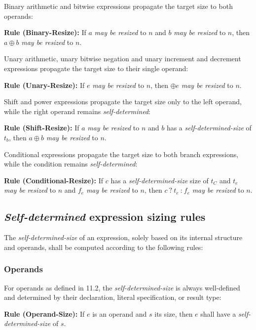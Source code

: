 \documentclass{article}
\newcommand{\sds}{\emph{self-determined-size}}
\newcommand{\mbr}{\emph{may be resized}}
\newenvironment{typingrule}[1]%
{\par\noindent\textbf{Rule (#1):} }%
{\par}
\begin{document}
Binary arithmetic and bitwise expressions propagate the target size to both
operands:

\begin{typingrule}{Binary-Resize}
  If $a$ \mbr{} to $n$ and $b$ \mbr{} to $n$, then $a \oplus b$ \mbr{} to $n$.
\end{typingrule}

Unary arithmetic, unary bitwise negation and unary increment and decrement
expressions propagate the target size to their single operand:

\begin{typingrule}{Unary-Resize}
  If $e$ \mbr{} to $n$, then $\oplus e$ \mbr{} to $n$.
\end{typingrule}

Shift and power expressions propagate the target size only to the left operand,
while the right operand remains \emph{self-determined}:

\begin{typingrule}{Shift-Resize}
  If $a$ \mbr{} to $n$ and $b$ has a \sds{} of $t_{b}$, then
  $a \oplus b$ \mbr{} to $n$.
\end{typingrule}

Conditional expressions propagate the target size to both branch expressions,
while the condition remains \emph{self-determined}:

\begin{typingrule}{Conditional-Resize}
  If $c$ has a \sds{} size of $t_{C}$ and $t_{e}$ \mbr{} to $n$ and $f_{e}$
  \mbr{} to $n$, then $c~\texttt{?}~t_{e}~\texttt{:}~f_{e}$ \mbr{} to $n$.
\end{typingrule}

\subsection{\emph{Self-determined} expression sizing rules}%

The \sds{} of an expression, solely based on its internal
structure and operands, shall be computed according to the following rules:

\subsubsection{Operands}%

For operands as defined in 11.2, the \sds{} is always
well-defined and determined by their declaration, literal specification, or
result type:

\begin{typingrule}{Operand-Size}
  If $e$ is an operand and $s$ its size, then $e$ shall have a \sds{} of $s$.
\end{typingrule}
\end{document}
